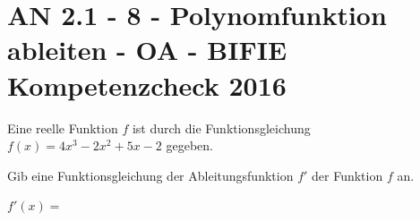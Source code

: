 \section{AN 2.1 - 8 - Polynomfunktion ableiten - OA - BIFIE Kompetenzcheck 2016}

\begin{beispiel}[AN 2.1]{1} %
				Eine reelle Funktion $f$ ist durch die Funktionsgleichung $f(x)=4x^{3}-2x^2+5x-2$ gegeben.

Gib eine Funktionsgleichung der Ableitungsfunktion $f'$ der Funktion $f$ an.

$f'(x)=$\,

\end{beispiel}	